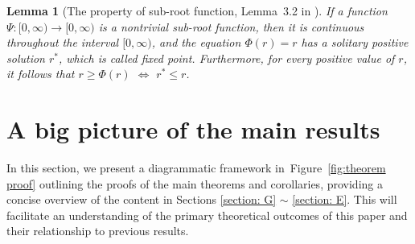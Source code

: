 \documentclass{article}
\newtheorem{lemma}{Lemma}
\begin{document}
\begin{lemma}[The property of sub-root function, Lemma~3.2 in \cite{Bartlett_2005}] 
\label{lemma:sub-root pro} 
If a function \( \Psi : [0, \infty) \rightarrow [0, \infty) \) is a nontrivial sub-root function,
then it is continuous throughout the interval \( [0, \infty) \), and the equation \( \Phi(r) = r \) has a solitary positive solution $r^*$, which is called fixed point. 
Furthermore, for every positive value of \( r \), it follows that \( r \geq \Phi(r) \) $\Longleftrightarrow$ \( r^* \leq r \). 
\end{lemma}

\section{A big picture of the main results} 
\label{sec-app:big_picture}


In this section, we present a diagrammatic framework in~Figure~\ref{fig:theorem proof} outlining the proofs of the main theorems and corollaries, providing a concise overview of the content in Sections \ref{section: G} $\sim$ \ref{section: E}. This will facilitate an understanding of the primary theoretical outcomes of this paper and their relationship to previous results.

\end{document}
